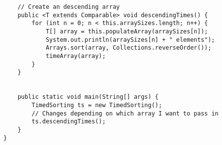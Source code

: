 \documentclass[oneside, a4paper]{article}
\begin{document}
\begin{lstlisting}
    // Create an descending array
    public <T extends Comparable> void descendingTimes() {
        for (int n = 0; n < this.arraySizes.length; n++) {
            T[] array = this.populateArray(arraySizes[n]);
            System.out.println(arraySizes[n] + " elements");
            Arrays.sort(array, Collections.reverseOrder());
            timeArray(array);
        }
    }


    public static void main(String[] args) {
        TimedSorting ts = new TimedSorting();
        // Changes depending on which array I want to pass in
        ts.descendingTimes();
    }
}

\end{lstlisting}
\end{document}
